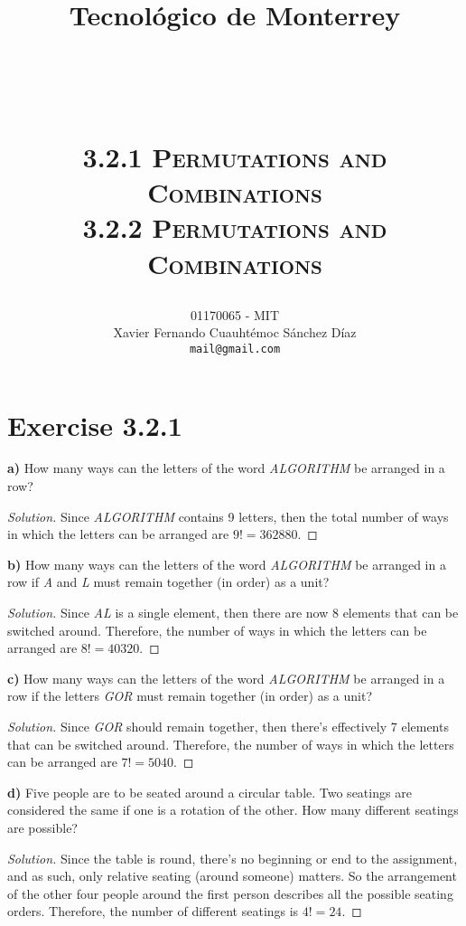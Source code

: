 \documentclass[titlepage, letterpaper, fleqn]{article}
\title{
\vspace{1in}
\textbf{Tecnológico de Monterrey} \\
\vspace{0.5in}
\textmd{\mahclass} \\
\large{\textit{\mahteacher}} \\
\vspace{0.5in}
\textsc{\mahtitle}\\
\textsc{3.2.1 Permutations and Combinations}\\
\textsc{3.2.2 Permutations and Combinations}\\
\author{01170065  - MIT \\
Xavier Fernando Cuauhtémoc Sánchez Díaz \\
\texttt{mail@gmail.com}}
\date{\mahdate}
}
\newcommand{\spacepls}{\vspace{5mm}}
\renewcommand\qedsymbol{\(\blacksquare\)}
\newenvironment{solution}
{\renewcommand\qedsymbol{$\square$}\begin{proof}[Solution]}
{\end{proof}}
\begin{document}
\begin{titlepage}
\maketitle
\end{titlepage}

%
%

\section{Exercise 3.2.1}

{\large \textbf{a)} How many ways can the letters of the word \textit{ALGORITHM} be arranged in a row?}

\begin{solution}
Since \textit{ALGORITHM} contains 9 letters, then the total number of ways in which the letters can be arranged are \(9! = 362880\).
\end{solution}

\spacepls

{\large \textbf{b)} How many ways can the letters of the word \textit{ALGORITHM} be arranged in a row if \textit{A} and \textit{L} must remain together (in order) as a unit?}

\begin{solution}
Since \textit{AL} is a single element, then there are now 8 elements that can be switched around. Therefore, the number of ways in which the letters can be arranged are \(8! = 40320\).
\end{solution}

\spacepls

{\large \textbf{c)} How many ways can the letters of the word \textit{ALGORITHM} be arranged in a row if the letters \textit{GOR} must remain together (in order) as a unit?}

\begin{solution}
Since \textit{GOR} should remain together, then there's effectively 7 elements that can be switched around. Therefore, the number of ways in which the letters can be arranged are \(7! = 5040\).
\end{solution}

\spacepls

{\large \textbf{d)} Five people are to be seated around a circular table. Two seatings are considered the same if one is a rotation of the other. How many different seatings are possible?}

\begin{solution}
Since the table is round, there's no beginning or end to the assignment, and as such, only relative seating (around someone) matters.
So the arrangement of the other four people around the first person describes all the possible seating orders.
Therefore, the number of different seatings is \(4! = 24\).
\end{solution}
\end{document}
